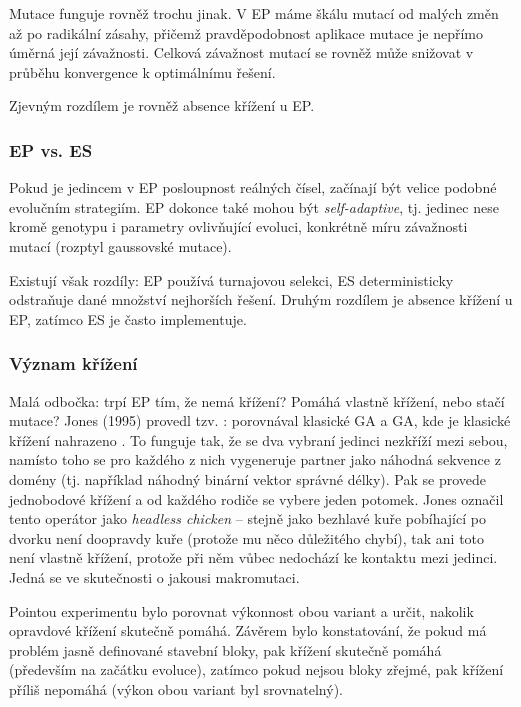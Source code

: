 Mutace funguje rovněž trochu jinak. V EP máme škálu mutací od malých změn až po radikální zásahy, přičemž pravděpodobnost aplikace mutace je nepřímo úměrná její závažnosti. Celková závažnost mutací se rovněž může snižovat v průběhu konvergence k optimálnímu řešení.

Zjevným rozdílem je rovněž absence křížení u EP.

\subsubsection{EP vs. ES}
Pokud je jedincem v EP posloupnost reálných čísel, začínají být velice podobné evolučním strategiím. EP dokonce také mohou být \textit{self-adaptive}, tj. jedinec nese kromě genotypu i parametry ovlivňující evoluci, konkrétně míru závažnosti mutací (rozptyl gaussovské mutace).

Existují však rozdíly: EP používá turnajovou selekci, ES deterministicky odstraňuje dané množství nejhorších řešení. Druhým rozdílem je absence křížení u EP, zatímco ES je často implementuje. 

\subsubsection{Význam křížení}
Malá odbočka: trpí EP tím, že nemá křížení? Pomáhá vlastně křížení, nebo stačí mutace? Jones (1995) provedl tzv. : porovnával klasické GA a GA, kde je klasické křížení nahrazeno . To funguje tak, že se dva vybraní jedinci nezkříží mezi sebou, namísto toho se pro každého z nich vygeneruje partner jako náhodná sekvence z domény (tj. například náhodný binární vektor správné délky). Pak se provede jednobodové křížení a od každého rodiče se vybere jeden potomek. Jones označil tento operátor jako \textit{headless chicken} -- stejně jako bezhlavé kuře pobíhající po dvorku není doopravdy kuře (protože mu něco důležitého chybí), tak ani toto  není vlastně křížení, protože při něm vůbec nedochází ke kontaktu mezi jedinci. Jedná se ve skutečnosti o jakousi makromutaci.

Pointou experimentu bylo porovnat výkonnost obou variant a určit, nakolik opravdové křížení skutečně pomáhá. Závěrem bylo konstatování, že pokud má problém jasně definované stavební bloky, pak křížení skutečně pomáhá (především na začátku evoluce), zatímco pokud nejsou bloky zřejmé, pak křížení příliš nepomáhá (výkon obou variant byl srovnatelný).

